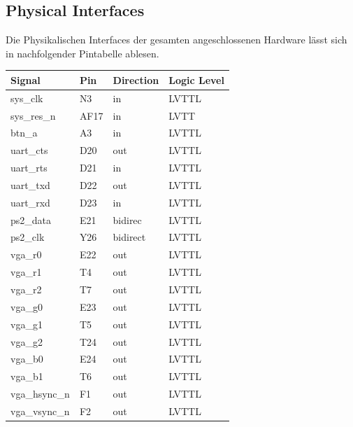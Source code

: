 \subsection{Physical Interfaces}
Die Physikalischen Interfaces der gesamten angeschlossenen Hardware lässt sich
in nachfolgender Pintabelle ablesen.
\begin{table}[!ht]
 \begin{center}
  \begin{tabular}{|l|l|l|l|}
   \hline Signal & Pin &Direction &Logic Level\\
   \hline
   sys\_clk & N3 & in & LVTTL\\
   sys\_res\_n & AF17 & in & LVTT\\
   btn\_a & A3 & in & LVTTL\\
   uart\_cts & D20 & out & LVTTL\\
   uart\_rts & D21 & in & LVTTL\\
   uart\_txd & D22 & out & LVTTL\\
   uart\_rxd & D23 & in & LVTTL\\
   ps2\_data & E21 & bidirec & LVTTL\\
   ps2\_clk & Y26 & bidirect & LVTTL\\
   vga\_r0 & E22 & out & LVTTL\\
   vga\_r1 & T4 & out & LVTTL\\
   vga\_r2 & T7 & out & LVTTL\\
   vga\_g0 & E23 & out & LVTTL\\
   vga\_g1 & T5 & out & LVTTL\\
   vga\_g2 & T24 & out & LVTTL\\
   vga\_b0 & E24 & out & LVTTL\\
   vga\_b1 & T6 & out & LVTTL\\
   vga\_hsync\_n & F1 & out & LVTTL\\
   vga\_vsync\_n & F2 & out & LVTTL\\
   \hline
  \end{tabular}
 \end{center}
\end{table}

